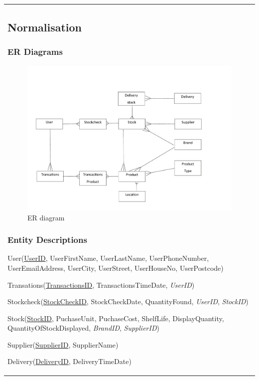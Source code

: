 \begin{center}
\begin{tabular}{|p{3cm}|}
\subsection{Normalisation}

\subsubsection{ER Diagrams}

\begin{figure}[H]
    \includegraphics[width=\textwidth]{./Design/pdfimages/ER_diagram.pdf}
    \caption{ER diagram} \label{fig:ER diagram}
\end{figure}

\subsubsection{Entity Descriptions}

User(\underline{UserID}, UserFirstName, UserLastName, UserPhoneNumber, UserEmailAddress, UserCity, UserStreet, UserHouseNo, UserPostcode)

Transations(\underline{TransactionsID}, TransactionsTimeDate, \emph{UserID})

Stockcheck(\underline{StockCheckID}, StockCheckDate, QuantityFound, \emph{UserID}, \emph{StockID})

Stock(\underline{StockID}, PuchaseUnit, PuchaseCost, ShelfLife, DisplayQuantity, QuantityOfStockDisplayed, \emph{BrandID}, \emph{SupplierID})

Supplier(\underline{SupplierID}, SupplierName)

Delivery(\underline{DeliveryID}, DeliveryTimeDate)


\end{tabular}
\end{center}
